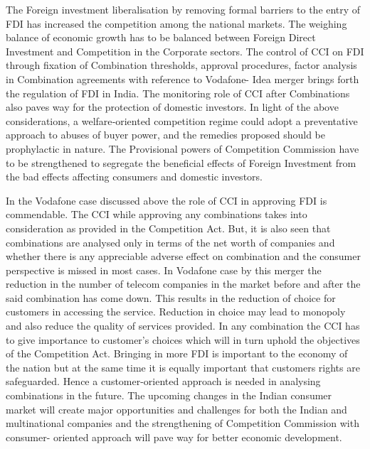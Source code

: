 \begin{multicols}{2}

\noi
The Foreign investment liberalisation by removing formal barriers to the entry of FDI has
increased the competition among the national markets. The weighing balance of economic
growth has to be balanced between Foreign Direct Investment and Competition in the
Corporate sectors. The control of CCI on FDI through fixation of Combination thresholds,
approval procedures, factor analysis in Combination agreements with reference to Vodafone-
Idea merger brings forth the regulation of FDI in India. The monitoring role of CCI after
Combinations also paves way for the protection of domestic investors. In light of the
above considerations, a welfare‐oriented competition regime could adopt a preventative
approach to abuses of buyer power, and the remedies proposed should be prophylactic in
nature. The Provisional powers of Competition Commission have to be strengthened to
segregate the beneficial effects of Foreign Investment from the bad effects affecting
consumers and domestic investors.

\noi
In the Vodafone case discussed above the role of CCI in approving FDI is commendable. The
CCI while approving any combinations takes into consideration as provided in the
Competition Act. But, it is also seen that combinations are analysed only in terms of the net
worth of companies and whether there is any appreciable adverse effect on combination and
the consumer perspective is missed in most cases. In Vodafone case by this merger the
reduction in the number of telecom companies in the market before and after the said
combination has come down. This results in the reduction of choice for customers in
accessing the service. Reduction in choice may lead to monopoly and also reduce the quality
of services provided. In any combination the CCI has to give importance to customer’s
choices which will in turn uphold the objectives of the Competition Act. Bringing in more
FDI is important to the economy of the nation but at the same time it is equally important that
customers rights are safeguarded. Hence a customer-oriented approach is needed in analysing
combinations in the future. The upcoming changes in the Indian consumer market will create
major opportunities and challenges for both the Indian and multinational companies and the
strengthening of Competition Commission with consumer- oriented approach will pave way
for better economic development.

\end{multicols}
\label{end2021-art1}
